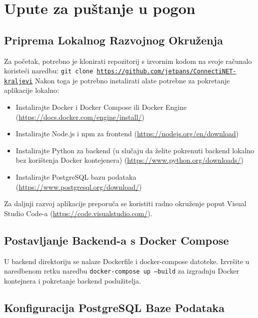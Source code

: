 			
			
			
			\section{Upute za puštanje u pogon}
				
			\subsection{Priprema Lokalnog Razvojnog Okruženja}
			
			Za početak, potrebno je klonirati repozitorij s izvornim kodom na svoje računalo koristeći naredbu:
			\texttt{git clone \url{https://github.com/jetpans/ConnectiNET-kraljevi}} 
			Nakon toga je potrebno instalirati alate potrebne za pokretanje aplikacije lokalno:
			
			\begin{itemize}
					\item Instalirajte Docker i Docker Compose ili Docker Engine (\url{https://docs.docker.com/engine/install/})
					\item Instalirajte Node.js i npm za frontend (\url{https://nodejs.org/en/download})
					\item Instalirajte Python za backend (u slučaju da želite pokrenuti backend lokalno bez korištenja Docker kontejenera) (\url{https://www.python.org/downloads/})
					\item Instalirajte PostgreSQL bazu podataka (\url{https://www.postgresql.org/download/})
			\end{itemize}
			
			Za daljnji razvoj aplikacije preporuča se koristiti radno okruženje poput Visual Studio Code-a (\url{https://code.visualstudio.com/}). 
			
			\subsection{Postavljanje Backend-a s Docker Compose}
			
			U backend direktoriju se nalaze Dockerfile i docker-compose datoteke. Izvršite u naredbenom retku naredbu 
			\texttt{docker-compose up --build} 
			za izgradnju Docker kontejnera i pokretanje backend poslužitelja.
			
			\subsection{Konfiguracija PostgreSQL Baze Podataka}
			
